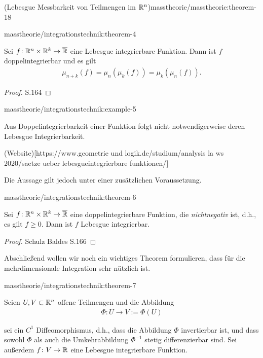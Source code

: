 \begin{theorem}{(Lebesgue Messbarkeit von Teilmengen im \protect\(\mathbb{R}^n\protect\))}{masstheorie/masstheorie:theorem-18}
\begin{theorem}{}{masstheorie/integrationstechnik:theorem-4}
\par
Sei \(f \colon \mathbb{R}^{n} \times \mathbb{R}^k \rightarrow \overline{\mathbb{R}}\) eine Lebesgue integrierbare Funktion.
Dann ist \(f\) doppelintegrierbar und es gilt
\begin{align*}
\mu_{n+k}(f) = \mu_n(\mu_k(f)) = \mu_k(\mu_n(f)).\end{align*}\end{theorem}

\begin{proof}
 S.164
\end{proof}
\begin{example}{}{masstheorie/integrationstechnik:example-5}



\par
Aus Doppelintegrierbarkeit einer Funktion folgt nicht notwendigerweise deren Lebesgue Integrierbarkeit.

\par
(Website){[}https://www.geometrie und logik.de/studium/analysis la ws 2020/saetze ueber lebesgueintegrierbare funktionen/{]}
\end{example}

\par
Die Aussage gilt jedoch unter einer zusätzlichen Voraussetzung.
\begin{theorem}{}{masstheorie/integrationstechnik:theorem-6}



\par
Sei \(f \colon \mathbb{R}^{n} \times \mathbb{R}^k \rightarrow \overline{\mathbb{R}}\) eine doppelintegrierbare Funktion, die \emph{nichtnegativ} ist, d.h., es gilt \(f \geq 0\).
Dann ist \(f\) Lebesgue integrierbar.
\end{theorem}

\begin{proof}
 Schulz Baldes S.166
\end{proof}

\par
Abschließend wollen wir noch ein wichtiges Theorem formulieren, dass für die mehrdimensionale Integration sehr nützlich ist.
\begin{theorem}{}{masstheorie/integrationstechnik:theorem-7}



\par
Seien \(U, V \subset \mathbb{R}^n\) offene Teilmengen und die Abbildung
\begin{align*}
\Phi \colon U \rightarrow V := \Phi(U)
\end{align*}
\par
sei ein \(C^1\) Diffeomorphismus, d.h., dass die Abbildung \(\Phi\) invertierbar ist, und dass sowohl \(\Phi\) als auch die Umkehrabbildung \(\Phi^{-1}\) stetig differenzierbar sind.
Sei außerdem \(f \colon V \rightarrow \mathbb{R}\) eine Lebesgue integrierbare Funktion.


\end{theorem}
\end{theorem}
